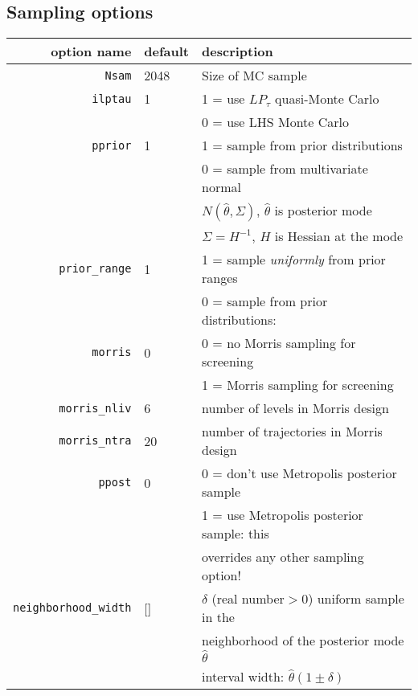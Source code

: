 \documentclass[12pt,a4paper]{article}
\begin{document}
\subsection{Sampling options}
\begin{tabular}{r|l|l}
                option name & default & description  \\ \hline
                 \verb"Nsam"& 2048& Size of MC sample \\
               \verb"ilptau"& 1& 1 = use $LP_\tau$ quasi-Monte Carlo \\
                            &  & 0 = use LHS Monte Carlo \\
               \verb"pprior"& 1& 1 = sample from prior distributions\\
                            &  & 0 = sample from multivariate
                            normal \\
                            &  & \hspace{0.5 cm} $N(\hat{\theta},\Sigma)$, $\hat{\theta}$ is posterior mode  \\
                            &  & \hspace{0.5 cm} $\Sigma = H^{-1}$, $H$ is Hessian at the mode\\
          \verb"prior_range"& 1& 1 = sample \textit{uniformly} from prior ranges\\
                            &  & 0 = sample from prior  distributions: \\
               \verb"morris"& 0& 0 = no Morris sampling for screening \\
                            &  & 1 = Morris sampling for screening     \\
          \verb"morris_nliv"& 6& number of levels in Morris design\\
          \verb"morris_ntra"& 20& number of trajectories in Morris design\\
                \verb"ppost"& 0& 0 = don't use Metropolis posterior sample\\
                            &  & 1 = use Metropolis posterior sample: this \\
                            &  & \hspace{0.5 cm} overrides any other sampling option!  \\
    \verb"neighborhood_width"& []& $\delta$ (real number$>0$) uniform sample in the\\
                            &  & neighborhood of the posterior mode $\hat{\theta}$ \\
                            &  & interval width: $\hat{\theta}(1\pm\delta)$ \\\hline
\end{tabular}
\end{document}
